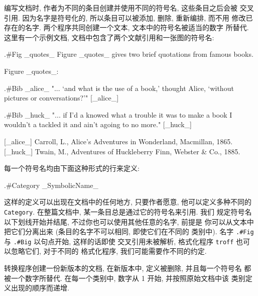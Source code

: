 编写文档时, 作者为不同的条目创建并使用不同的符号名, 这些条目之后会被
交叉引用. 因为名字是符号化的, 所以条目可以被添加, 删除, 重新编排, 而不用
修改已存在的名字. 两个程序共同创建一个文本, 文本中的符号名被适当的数字
所替代. 这里有一个示例文档, 文档中包含了两个文献引用和一张图的符号名:
\begin{file}
    .#Fig _quotes_
    Figure _quotes_ gives two brief quotations from famous books.

                            Figure _quotes_:

    .#Bib _alice_
      "... `and what is the use of a book,' thought Alice,
      `without pictures or conversations?'" [_alice_]

    .#Bib _huck_
      "... if I'd a knowed what a trouble it was to make a book
      I wouldn't a tackled it and ain't agoing to no more." [_huck_]


    [_alice_] Carroll, L., Alice's Adventures in Wonderland,
        Macmillan, 1865.
    [_huck_] Twain, M., Adventures of Huckleberry Finn,
        Webster & Co., 1885.
\end{file}
每一个符号名均由下面这种形式的行来定义:
\begin{file}
    .#Category _SymbolicName_
\end{file}
这样的定义可以出现在文档中的任何地方, 只要作者愿意, 他可以定义多种不同的
\texttt{Category}. 在整篇文档中, 某一条目总是通过它的符号名来引用. 我们 
规定符号名以下划线开始并结尾, 不过你也可以使用其他任意的名字, 前提是
你可以从文本中把它们分离出来 (条目的名字不可以相同, 即使它们在不同的
类别中). 名字 \texttt{.\#Fig} 与 \texttt{.\#Big} 以句点开始, 这样的话即使
交叉引用未被解析, 格式化程序 \texttt{troff} 也可以忽略它们, 对于不同的
格式化程序, 我们可能需要作不同的约定.

转换程序创建一份新版本的文档, 在新版本中, 定义被删除, 并且每一个符号名
都被一个数字所替代. 在每一个类别中, 数字从 1 开始, 并按照原始文档中该
类别定义出现的顺序而递增. 

